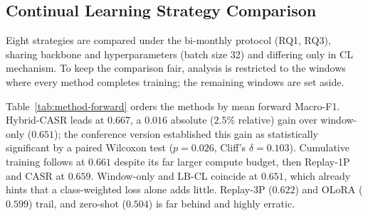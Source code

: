 \documentclass[a4paper,twoside]{article}
\begin{document}
\subsection{Continual Learning Strategy Comparison}
\label{sec:method-comparison}

\noindent
Eight strategies are compared under the bi-monthly protocol (RQ1, RQ3), sharing backbone and hyperparameters (batch size 32) and differing only in CL mechanism. To keep the comparison fair, analysis is restricted to the windows where every method completes training; the remaining windows are set aside.

\begin{table}[t]
\centering
\caption{Forward evaluation of continual learning methods. Reproduced from the conference version~\citep{Dou2026ICISSP}.}
\label{tab:method-forward}
  \centering
\end{table}

Table~\ref{tab:method-forward} orders the methods by mean forward Macro-F1. Hybrid-CASR leads at $0.667$, a $0.016$ absolute ($2.5\%$ relative) gain over window-only ($0.651$); the conference version established this gain as statistically significant by a paired Wilcoxon test ($p=0.026$, Cliff's $\delta=0.103$). Cumulative training follows at $0.661$ despite its far larger compute budget, then Replay-1P and CASR at $0.659$. Window-only and LB-CL coincide at $0.651$, which already hints that a class-weighted loss alone adds little. Replay-3P ($0.622$) and OLoRA ($0.599$) trail, and zero-shot ($0.504$) is far behind and highly erratic.
\end{document}
